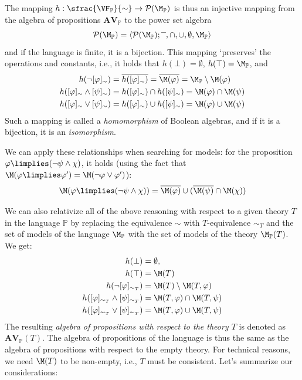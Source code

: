 The mapping $h:\sfrac{\VF_\mathbb{P}}{\sim} \to \mathcal{P}(\M_\mathbb{P})$ is thus an injective mapping from the algebra of propositions $\mathbf{AV}_\mathbb{P}$ to the power set algebra
$$
\mathbf{\mathcal{P}(\M_\mathbb{P})} = \langle \mathcal{P}(\M_\mathbb{P}); \overline{\phantom{x}}, \cap, \cup, \emptyset, \M_\mathbb{P} \rangle
$$
and if the language is finite, it is a bijection. This mapping `preserves' the operations and constants, i.e., it holds that $h(\bot) = \emptyset$, $h(\top) = \M_\mathbb{P}$, and
\begin{align*}
    h(\neg[\varphi]_\sim) &= \overline{h([\varphi]_\sim)} = \overline{\M(\varphi)} = \M_\mathbb{P} \setminus \M(\varphi) \\
    h([\varphi]_\sim \land [\psi]_\sim) &= h([\varphi]_\sim) \cap h([\psi]_\sim) = \M(\varphi) \cap \M(\psi) \\
    h([\varphi]_\sim \lor [\psi]_\sim) &= h([\varphi]_\sim) \cup h([\psi]_\sim) = \M(\varphi) \cup \M(\psi)
\end{align*}
Such a mapping is called a \emph{homomorphism} of Boolean algebras, and if it is a bijection, it is an \emph{isomorphism}.

\begin{remark}
We can apply these relationships when searching for models: for the proposition $\varphi \limplies (\neg \psi \land \chi)$, it holds (using the fact that $\M(\varphi \limplies \varphi') = \M(\neg \varphi \lor \varphi')$):
$$
\M(\varphi \limplies (\neg \psi \land \chi)) = \overline{\M(\varphi)} \cup (\overline{\M(\psi)} \cap \M(\chi))
$$
\end{remark}

We can also relativize all of the above reasoning with respect to a given theory $T$ in the language $\mathbb{P}$ by replacing the equivalence $\sim$ with $T$-equivalence $\sim_T$ and the set of models of the language $\M_\mathbb{P}$ with the set of models of the theory $\M_\mathbb{P}(T)$. We get:
\begin{align*}
    h(\bot) &= \emptyset,\\
    h(\top) &= \M(T)\\
    h(\neg[\varphi]_{\sim_T}) &= \M(T) \setminus \M(T,\varphi)\\
    h([\varphi]_{\sim_T} \land [\psi]_{\sim_T}) &= \M(T,\varphi) \cap \M(T,\psi)\\
    h([\varphi]_{\sim_T} \lor [\psi]_{\sim_T}) &= \M(T,\varphi) \cup \M(T,\psi)
\end{align*}
The resulting \emph{algebra of propositions with respect to the theory $T$} is denoted as $\mathbf{AV}_\mathbb{P}(T)$. The algebra of propositions of the language is thus the same as the algebra of propositions with respect to the empty theory. For technical reasons, we need $\M(T)$ to be non-empty, i.e., $T$ must be consistent. Let's summarize our considerations:

